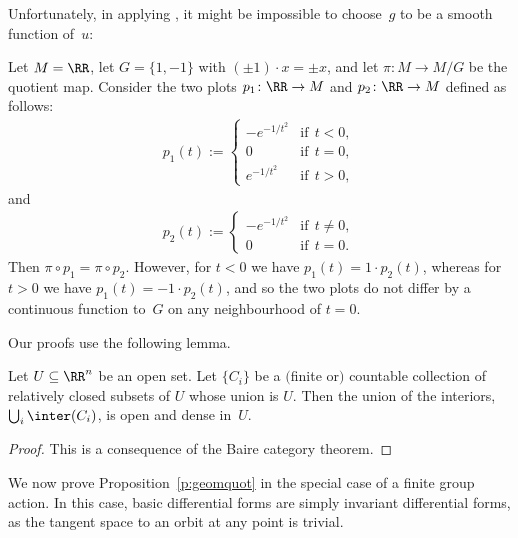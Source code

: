Unfortunately, in applying ,
it might be impossible to choose~$g$
to be a smooth function of~$u$:

\begin{Example}[$\ZZ_2\circlearrowright\RR$]
\label{x:plots differ nonsmoothly}
Let $M=\RR$, let $G = \{ 1, -1 \}$ with $(\pm1) \cdot x = \pm x$,
and let $\pi \colon M \to M/G$ be the quotient map.
Consider the two plots
$p_1 \colon \RR\to M$ and $p_2 \colon \RR\to M$
def\/ined as follows:
\begin{gather*} p_1(t) := \begin{cases} -e^{-1/t^2}  & \text{if} \ \ t<0, \\
 0  & \text{if} \ \ t=0, \\
 e^{-1/t^2}  & \text{if} \ \ t>0,
\end{cases}\end{gather*}
and
\begin{gather*} p_2(t):= \begin{cases} -e^{-1/t^2}  & \text{if} \ \ t\neq 0, \\
 0  & \text{if} \ \ t=0.
\end{cases}\end{gather*}
Then $\pi \circ p_1 = \pi \circ p_2$.
However, for $t<0$ we have $p_1(t)=1\cdot p_2(t)$,
whereas for $t>0$ we have $p_1(t)=-1\cdot p_2(t)$,
and so the two plots
do not dif\/fer by a continuous function to~$G$
on any neighbourhood of $t=0$.
\end{Example}

Our proofs use the following lemma.

\begin{Lemma}\label{l:baire}
Let $U \subseteq \RR^n$ be an open set.
Let $\{ C_i \}$ be a $($finite or$)$ countable collection
of relatively closed subsets of $U$ whose union is $U$.
Then the union of the interiors, $\bigcup_i \inter(C_i)$,
is open and dense in~$U$.
\end{Lemma}

\begin{proof}
This is a consequence of the Baire category theorem.
\end{proof}


We now prove Proposition~\ref{p:geomquot} in the special case of a f\/inite group action. In this case, basic dif\/ferential forms are simply invariant dif\/ferential forms, as the tangent space to an orbit at any point is trivial.

